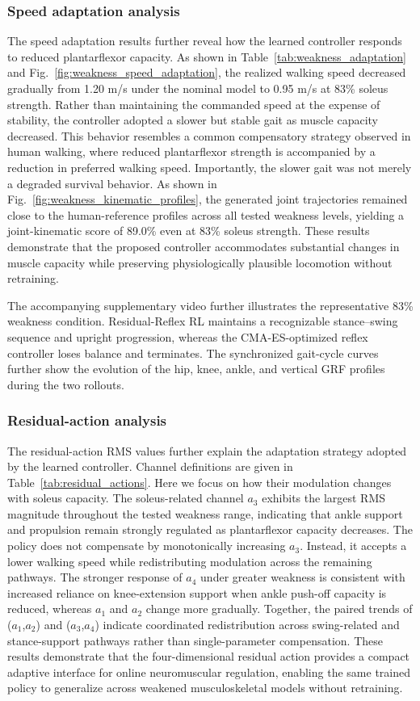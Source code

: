 \documentclass[acmtog,review,anonymous]{acmart}
\newcommand{\suppvideo}{supplementary video}
\begin{document}
\subsubsection{Speed adaptation analysis}
The speed adaptation results further reveal how the learned controller responds to reduced plantarflexor capacity. As shown in
Table~\ref{tab:weakness_adaptation} and
Fig.~\ref{fig:weakness_speed_adaptation}, the realized walking speed decreased gradually from 1.20 m/s under the nominal model to 0.95 m/s at 83\% soleus strength. Rather than maintaining the commanded speed at the expense of stability, the controller adopted a slower but stable gait as muscle capacity decreased. This behavior resembles a common compensatory strategy observed in human walking, where reduced plantarflexor strength is accompanied by a reduction in preferred walking speed. Importantly, the slower gait was not merely a degraded survival behavior. As shown in Fig.~\ref{fig:weakness_kinematic_profiles}, the generated joint trajectories remained close to the human-reference profiles across all tested weakness levels, yielding a joint-kinematic score of 89.0\% even at 83\% soleus strength. These results demonstrate that the proposed controller accommodates substantial changes in muscle capacity while preserving physiologically plausible locomotion without retraining.

The accompanying \suppvideo{} further illustrates the representative 83\% weakness condition. Residual-Reflex RL maintains a recognizable stance--swing sequence and upright progression, whereas the CMA-ES-optimized reflex controller loses balance and terminates. The synchronized gait-cycle curves further show the evolution of the hip, knee, ankle, and vertical GRF profiles during the two rollouts.

\subsubsection{Residual-action analysis}
The residual-action RMS values further explain the adaptation strategy adopted by the learned controller. Channel definitions are given in Table~\ref{tab:residual_actions}. Here we focus on how their modulation changes with soleus capacity. The soleus-related channel $a_3$ exhibits the largest RMS magnitude throughout the tested weakness range, indicating that ankle support and propulsion remain strongly regulated as plantarflexor capacity decreases. The policy does not compensate by monotonically increasing $a_3$. Instead, it accepts a lower walking speed while redistributing modulation across the remaining pathways. The stronger response of $a_4$ under greater weakness is consistent with increased reliance on knee-extension support when ankle push-off capacity is reduced, whereas $a_1$ and $a_2$ change more gradually. Together, the paired trends of ($a_1$,$a_2$) and ($a_3$,$a_4$) indicate coordinated redistribution across swing-related and stance-support pathways rather than single-parameter compensation. These results demonstrate that the four-dimensional residual action provides a compact adaptive interface for online neuromuscular regulation, enabling the same trained policy to generalize across weakened musculoskeletal models without retraining.
\end{document}
